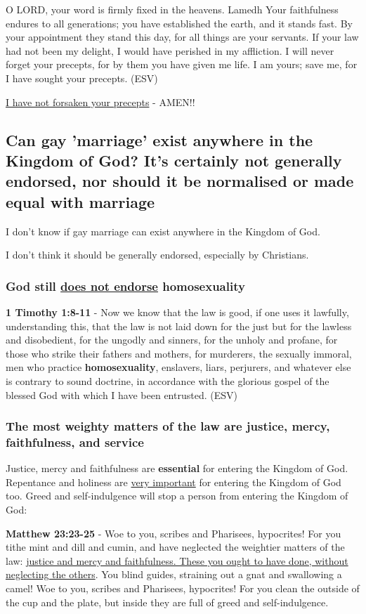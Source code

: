 \documentclass[11pt]{article}
\begin{document}
O LORD, your word is firmly fixed in the heavens. Lamedh Your faithfulness endures to all generations; you have established the earth, and it stands fast. By your appointment they stand this day, for all things are your servants. If your law had not been my delight, I would have perished in my affliction. I will never forget your precepts, for by them you have given me life. I am yours; save me, for I have sought your precepts. (ESV)

\uline{I have not forsaken your precepts} - AMEN!!

\subsection{Can gay 'marriage' exist anywhere in the Kingdom of God? It's certainly not generally endorsed, nor should it be normalised or made equal with marriage}
\label{sec:orgeaec717}
I don't know if gay marriage can exist anywhere in the Kingdom of God.

I don't think it should be generally endorsed, especially by Christians.

\subsubsection{God still \underline{does not endorse} homosexuality}
\label{sec:org02a773e}
\textbf{1 Timothy 1:8-11} - Now we know that the law is good, if one uses it lawfully, understanding this, that the law is not laid down for the just but for the lawless and disobedient, for the ungodly and sinners, for the unholy and profane, for those who strike their fathers and mothers, for murderers, the sexually immoral, men who practice \textbf{homosexuality}, enslavers, liars, perjurers, and whatever else is contrary to sound doctrine, in accordance with the glorious gospel of the blessed God with which I have been entrusted. (ESV)

\subsubsection{The most weighty matters of the law are justice, mercy, faithfulness, and service}
\label{sec:org75ba917}
Justice, mercy and faithfulness are \textbf{essential} for entering the Kingdom of God. Repentance and holiness are \uline{very important} for entering the Kingdom of God too. Greed and self-indulgence will stop a person from entering the Kingdom of God:

\textbf{Matthew 23:23-25} - Woe to you, scribes and Pharisees, hypocrites! For you tithe mint and dill and cumin, and have neglected the weightier matters of the law: \uline{justice and mercy and faithfulness. These you ought to have done, without neglecting the others}.  You blind guides, straining out a gnat and swallowing a camel!  Woe to you, scribes and Pharisees, hypocrites! For you clean the outside of the cup and the plate, but inside they are full of greed and self-indulgence.
\end{document}
